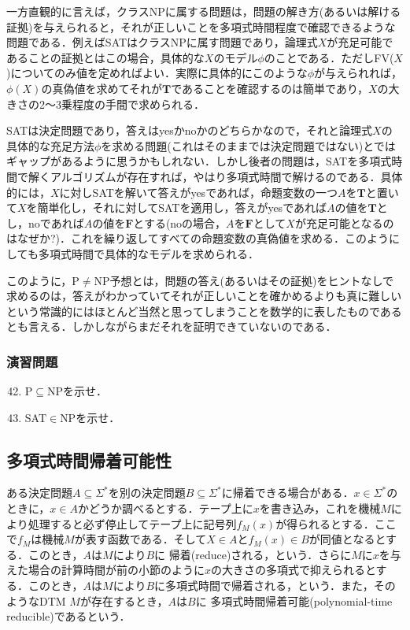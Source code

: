 \documentclass{ltjsarticle}
\theoremstyle{mystyle1}
\theoremstyle{mystyle3}
\theoremstyle{mystyle2}
\newcommand{\bT}{\ensuremath{\mathbf{T}}}
\newcommand{\bF}{\ensuremath{\mathbf{F}}}
\newcommand{\red}[1]{{\color{red} #1}}
\begin{document}
一方直観的に言えば，クラスNPに属する問題は，問題の解き方(あるいは解ける証拠)を与えられると，それが正しいことを多項式時間程度で確認できるような問題である．例えばSATはクラスNPに属す問題であり，論理式$X$が充足可能であることの証拠とはこの場合，具体的な$X$のモデル$\phi$のことである．ただしFV($X$)についてのみ値を定めればよい．実際に具体的にこのような$\phi$が与えられれば，$\phi\left(X\right)$の真偽値を求めてそれが$\bT$であることを確認するのは簡単であり，$X$の大きさの2～3乗程度の手間で求められる．

SATは決定問題であり，答えはyesかnoかのどちらかなので，それと論理式$X$の具体的な充足方法$\phi$を求める問題(これはそのままでは決定問題ではない)とではギャップがあるように思うかもしれない．しかし後者の問題は，SATを多項式時間で解くアルゴリズムが存在すれば，やはり多項式時間で解けるのである．具体的には，$X$に対しSATを解いて答えがyesであれば，命題変数の一つ$A$を$\bT$と置いて$X$を簡単化し，それに対してSATを適用し，答えがyesであれば$A$の値を$\bT$とし，noであれば$A$の値を$\bF$とする(noの場合，$A$を$\bF$として$X$が充足可能となるのはなぜか?)．これを繰り返してすべての命題変数の真偽値を求める．このようにしても多項式時間で具体的なモデルを求められる．

このように，P$\neq$NP予想とは，問題の答え(あるいはその証拠)をヒントなしで求めるのは，答えがわかっていてそれが正しいことを確かめるよりも真に難しいという常識的にはほとんど当然と思ってしまうことを数学的に表したものであるとも言える．しかしながらまだそれを証明できていないのである．
\subsubsection*{演習問題}
\begin{enumerate}
  \setcounter{enumi}{41}
  \item P$\subseteq$NPを示せ．
  \item SAT$\in$NPを示せ．
\end{enumerate}
\subsection{多項式時間帰着可能性}
ある決定問題$A\subseteq\Sigma^\ast$を別の決定問題$B\subseteq\Sigma^\ast$に帰着できる場合がある．$x\in\Sigma^\ast$のときに，$x\in A$かどうか調べるとする．テープ上に$x$を書き込み，これを機械$M$により処理すると必ず停止してテープ上に記号列$f_M \left(x\right)$が得られるとする．ここで$f_M$は機械$M$が表す函数である．そして$X\in A$と$f_M\left(x\right)\in B$が同値となるとする．このとき，$A$は$M$により$B$に\red{帰着}(reduce)される，という．さらに$M$に$x$を与えた場合の計算時間が前の小節のように$x$の大きさの多項式で抑えられるとする．このとき，$A$は$M$により$B$に多項式時間で帰着される，という．また，そのようなDTM $M$が存在するとき，$A$は$B$に\red{多項式時間帰着可能}(polynomial-time reducible)であるという．
\end{document}
